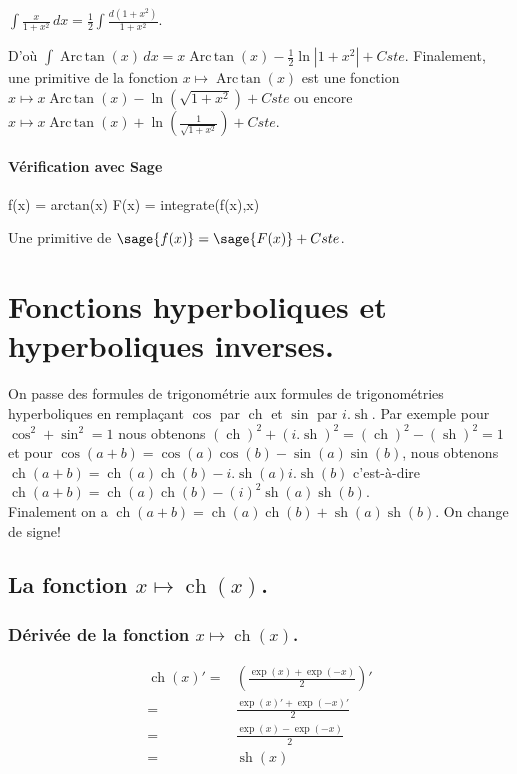 \documentclass[a4paper,14pt]{extreport} %
\renewcommand{\sinh}{\mathop{\mathrm{sh}}}
\renewcommand{\cosh}{\mathop{\mathrm{ch}}}
\renewcommand{\arctan}{\mathop{\mathrm{Arc\,tan}}}
\begin{document}
$\int \frac{x}{1+ x^2} \, dx = \frac{1}{2} \int \frac{d(1+x^2)}{1+ x^2} $.

D'où $\int \arctan(x) \, dx = x \arctan(x) - \frac{1}{2} \ln \left| 1+ x^2 \right| + Cste $. 
Finalement, une primitive de la fonction $x \mapsto \arctan(x) $ est une fonction $x \mapsto x \arctan(x) -\ln\left( \sqrt{1+ x^2}\right) + Cste $ ou encore $x \mapsto x \arctan(x) +\ln\left( \frac{1}{\sqrt{1+ x^2}}\right) + Cste $.


\subsubsection{Vérification avec Sage}

\begin{sageblock}
    f(x) = arctan(x)
    F(x) = integrate(f(x),x)
\end{sageblock}

Une primitive de $\sage{f(x)} = \sage{F(x)} + Cste$.


\chapter{Fonctions hyperboliques et hyperboliques inverses.}


On passe des formules de trigonométrie aux formules de trigonométries hyperboliques en remplaçant $\cos$ par $\cosh$ et $\sin$ par $i . \sinh$. Par exemple pour $\cos^2+\sin^2=1$
nous obtenons $(\cosh)^2 + (i . \sinh)^2= (\cosh)^2 - (\sinh)^2 = 1$ et pour $\cos(a+b)=\cos(a) \cos(b) - \sin(a) \sin(b) $, nous obtenons $\cosh(a+b)=\cosh(a) \cosh(b) - i .\sinh(a) i . \sinh(b) $ c'est-à-dire $\cosh(a+b)=\cosh(a) \cosh(b) - (i)^2 \sinh(a) \sinh(b) $. \\ Finalement on a $\cosh(a+b) = \cosh(a) \cosh(b) + \sinh(a) \sinh(b) $. On change de signe!



\section{La fonction  $x \mapsto \cosh(x)$.}

\subsection{Dérivée de la fonction $x \mapsto \cosh(x)$.}
\begin{align*}
\cosh(x)' =& \left( \frac{\exp(x)+\exp(-x)}{2} \right)' \\ =& \frac{\exp(x)'+\exp(-x)'}{2} \\=& \frac{\exp(x)-\exp(-x)}{2} \\=& \sinh(x)
\end{align*}
\end{document}
